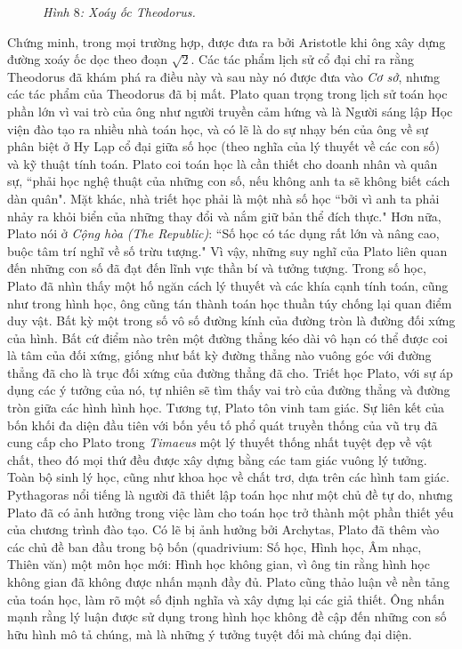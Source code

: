 \begin{multicols}{2}
\begin{figure}[H]
		\caption{\small\textit{\color{lichsutoanhoc}Hình $8$: Xoáy ốc Theodorus.}}
		\vspace*{-10pt}
	\end{figure}
	Chứng minh, trong mọi trường hợp, được đưa ra bởi Aristotle khi ông xây dựng đường xoáy ốc dọc theo đoạn $\sqrt{2}$. Các tác phẩm lịch sử cổ đại chỉ ra rằng Theodorus đã khám phá ra điều này và sau này nó được đưa vào \textit{Cơ sở}, nhưng các tác phẩm của Theodorus đã bị mất. 
	\vskip 0.1cm
	Plato quan trọng trong lịch sử toán học phần lớn vì vai trò của ông như người truyền cảm hứng và là Người sáng lập Học viện đào tạo ra nhiều nhà toán học, và có lẽ là do sự nhạy bén của ông về sự phân biệt ở Hy Lạp cổ đại giữa số học (theo nghĩa của lý thuyết về các con số) và kỹ thuật tính toán. 
	\vskip 0.1cm
	Plato coi toán học là cần thiết cho doanh nhân và quân sự, ``phải học nghệ thuật của những con số, nếu không anh ta sẽ không biết cách dàn quân".
	\vskip 0.1cm
	Mặt khác, nhà triết học phải là một nhà số học ``bởi vì anh ta phải nhảy ra khỏi biển của những thay đổi và nắm giữ bản thể đích thực." Hơn nữa, Plato nói ở \textit{Cộng hòa (The Republic)}: ``Số học có tác dụng rất lớn và nâng cao, buộc tâm trí nghĩ về số trừu tượng."  Vì vậy, những suy nghĩ của Plato liên quan đến những con số đã đạt đến lĩnh vực thần bí và tưởng tượng.
	\vskip 0.1cm 
	Trong số học, Plato đã nhìn thấy một hố ngăn cách lý thuyết và các khía cạnh tính toán, cũng như trong hình học, ông cũng tán thành toán học thuần túy chống lại quan điểm duy vật.  
	\vskip 0.1cm
	Bất kỳ một trong số vô số đường kính của đường tròn là đường đối xứng của hình. Bất cứ điểm nào trên một đường thẳng kéo dài vô hạn có thể được coi là tâm của đối xứng, giống như bất kỳ đường thẳng nào vuông góc với đường thẳng đã cho là trục đối xứng của đường thẳng đã cho. Triết học Plato, với sự áp dụng các ý tưởng của nó, tự nhiên sẽ tìm thấy vai trò của đường thẳng và đường tròn giữa các hình hình học. Tương tự, Plato tôn vinh tam giác.
	\vskip 0.1cm 
	Sự liên kết của bốn khối đa diện đầu tiên với bốn yếu tố phổ quát truyền thống của vũ trụ đã cung cấp cho Plato trong \textit{Timaeus}  một lý thuyết thống nhất tuyệt đẹp về vật chất, theo đó mọi thứ đều được xây dựng bằng các tam giác vuông lý tưởng. Toàn bộ sinh lý học, cũng như khoa học về chất trơ, dựa trên các hình tam giác.
	\vskip 0.1cm
	Pythagoras nổi tiếng là người đã thiết lập toán học như một chủ đề tự do, nhưng Plato đã có ảnh hưởng trong việc làm cho toán học trở thành một phần thiết yếu của chương trình đào tạo.
	\vskip 0.1cm
	Có lẽ bị ảnh hưởng bởi Archytas, Plato đã thêm vào các chủ đề ban đầu trong bộ bốn (quadrivium: Số học, Hình học, Âm nhạc, Thiên văn) một môn học mới: Hình học không gian, vì ông tin rằng hình học không gian đã không được nhấn mạnh đầy đủ. Plato cũng thảo luận về nền tảng của toán học, làm rõ một số định nghĩa và xây dựng lại các giả thiết. Ông nhấn mạnh rằng lý luận được sử dụng trong hình học không đề cập đến những con số hữu hình mô tả chúng, mà là những ý tưởng tuyệt đối mà chúng đại diện. 

\end{multicols}
